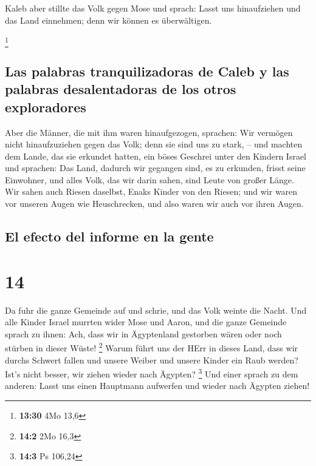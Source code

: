  Kaleb aber stillte das Volk gegen Mose und sprach: Lasst
uns hinaufziehen und das Land einnehmen; denn wir können es
überwältigen.

\footnote{\textbf{13:30} 4Mo 13,6}

\hypertarget{las-palabras-tranquilizadoras-de-caleb-y-las-palabras-desalentadoras-de-los-otros-exploradores}{%
\subsection{Las palabras tranquilizadoras de Caleb y las palabras
desalentadoras de los otros
exploradores}\label{las-palabras-tranquilizadoras-de-caleb-y-las-palabras-desalentadoras-de-los-otros-exploradores}}

 Aber die Männer, die mit ihm waren hinaufgezogen,
sprachen: Wir vermögen nicht hinaufzuziehen gegen das Volk; denn sie
sind uns zu stark, --  und machten dem Lande, das sie
erkundet hatten, ein böses Geschrei unter den Kindern Israel und
sprachen: Das Land, dadurch wir gegangen sind, es zu erkunden, frisst
seine Einwohner, und alles Volk, das wir darin sahen, sind Leute von
großer Länge.  Wir sahen auch Riesen daselbst, Enaks
Kinder von den Riesen; und wir waren vor unseren Augen wie Heuschrecken,
und also waren wir auch vor ihren Augen.

\hypertarget{el-efecto-del-informe-en-la-gente}{%
\subsection{El efecto del informe en la
gente}\label{el-efecto-del-informe-en-la-gente}}

\hypertarget{section-13}{%
\section{14}\label{section-13}}

 Da fuhr die ganze Gemeinde auf und schrie, und das Volk
weinte die Nacht.  Und alle Kinder Israel murrten wider
Mose und Aaron, und die ganze Gemeinde sprach zu ihnen: Ach, dass wir in
Ägyptenland gestorben wären oder noch stürben in dieser Wüste!
\footnote{\textbf{14:2} 2Mo 16,3}  Warum führt uns der
HErr in dieses Land, dass wir durchs Schwert fallen und unsere Weiber
und unsere Kinder ein Raub werden? Ist's nicht besser, wir ziehen wieder
nach Ägypten? \footnote{\textbf{14:3} Ps 106,24}  Und
einer sprach zu dem anderen: Lasst uns einen Hauptmann aufwerfen und
wieder nach Ägypten ziehen!

